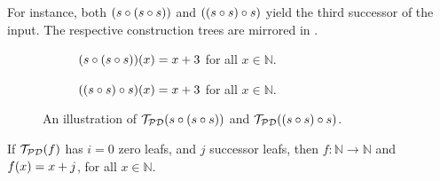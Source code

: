 For instance, both $\p{s \circ \p{s \circ s}}$ and $\p{\p{s \circ s} \circ s}$
yield the third successor of the input. The respective construction trees are
mirrored in .

\begin{figure}[h!]
\centering
%
\begin{subfigure}{0.49\textwidth}
\centering
{}
\caption[]{$\p{s \circ \p{s \circ s}}\p{x} = x + 3$ for all $x \in
\mathbb{N}$.}
\end{subfigure}
%
\begin{subfigure}{0.49\textwidth}
\centering
{}
\caption[]{$\p{\p{s \circ s} \circ s}\p{x} = x + 3$ for all $x \in
\mathbb{N}$.}
\end{subfigure}
\caption[]{An illustration of $\mathcal{T}_\mathcal{PD}\p{s \circ \p{s \circ
s}}$ and $\mathcal{T}_\mathcal{PD}\p{\p{s \circ s} \circ s}$.}
\label{fig:mirror-s-s-s}
\end{figure}

\begin{lemma} \label{lem:p-no-zero} If $\mathcal{T}_\mathcal{PD}\p{f}$ has
$i=0$ zero leafs, and $j$ successor leafs, then $f : \mathbb{N} \rightarrow
\mathbb{N}$ and $f\p{x} = x + j$, for all $x \in \mathbb{N}$. \end{lemma}


